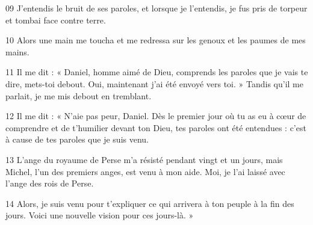 
09 J’entendis le bruit de ses paroles, et lorsque je l’entendis, je fus pris de torpeur et tombai face contre terre.

10 Alors une main me toucha et me redressa sur les genoux et les paumes de mes mains.

11 Il me dit : « Daniel, homme aimé de Dieu, comprends les paroles que je vais te dire, mets-toi debout. Oui, maintenant j’ai été envoyé vers toi. » Tandis qu’il me parlait, je me mis debout en tremblant.

12 Il me dit : « N’aie pas peur, Daniel. Dès le premier jour où tu as eu à cœur de comprendre et de t’humilier devant ton Dieu, tes paroles ont été entendues : c’est à cause de tes paroles que je suis venu.

13 L’ange du royaume de Perse m’a résisté pendant vingt et un jours, mais Michel, l’un des premiers anges, est venu à mon aide. Moi, je l’ai laissé avec l’ange des rois de Perse.

14 Alors, je suis venu pour t’expliquer ce qui arrivera à ton peuple à la fin des jours. Voici une nouvelle vision pour ces jours-là. »